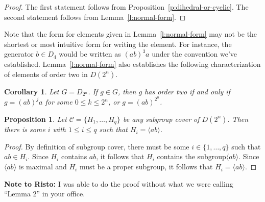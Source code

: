 \documentclass{amsart}
\numberwithin{equation} {section}
\newtheorem{proposition}[equation]{Proposition}
\newtheorem{corollary}[equation]{Corollary}
\theoremstyle{definition}
\begin{document}
\begin{proof}
The first statement follows from Proposition~\ref{p:dihedral-or-cyclic}. The second statement follows from Lemma~\ref{l:normal-form}. 
\end{proof} 

Note that the form for elements given in Lemma~\ref{l:normal-form} may not be the shortest or most intuitive form for writing the element. For instance, the generator $b \in D_4$ would be written as $(ab)^3a$ under the convention we've established. Lemma~\ref{l:normal-form} also establishes the following characterization of elements of order two in $D(2^n)$. 

\begin{corollary}\label{c:elements-of-order-two}
Let $G = D_{2^n}$. If $g \in G$, then $g$ has order two if and only if $g = (ab)^ja$ for some $0 \leq k \leq 2^n$, or $g = (ab)^{2^n}$. 
\end{corollary} 

\begin{proposition}\label{p:subgroup-cover-must-contain-maximal-cyclic}
Let $\mathcal{C} = \{H_1, \ldots, H_q \}$ be any subgroup cover of $D(2^n)$. Then there is some $i$ with $1 \leq i \leq q$ such that $H_i = \langle ab \rangle$.
\end{proposition}

\begin{proof}
By definition of subgroup cover, there must be some $i \in \{1,\ldots, q\}$ such that $ab\in H_i$. Since $H_i$ contains $ab$, it follows that $H_ i$ contains the subgroup$\langle ab \rangle$. Since $\langle ab \rangle$ is maximal and $H_i$ must be a proper subgroup, it follows that $H_i = \langle ab \rangle$. 
\end{proof}

\textbf{Note to Risto:} I was able to do the proof without what we were calling ``Lemma 2'' in your office. 

\begin{comment}
This was originally included as a Lemma, but I no longer feel it is necessary. 

\begin{proposition}\label{p:how-to-cover-reflections}
Le $B = \{(ab)^ja \mid 0 \leq j \leq 2^{n-1} \}$. Let $\mathcal{C}$ be a collection of subgroups of $D(2^n)$. Then $\mathcal{C}$ is a minimal powerful subgroup cover of $B$ if and only if removing the subgroup $\langle ab \rangle$ from $C$ results in a minimal powerful subgroup cover of $D(2^n)$. 
\end{proposition}

\begin{proof}
todo. 
\end{proof}
\end{comment}
\end{document}
